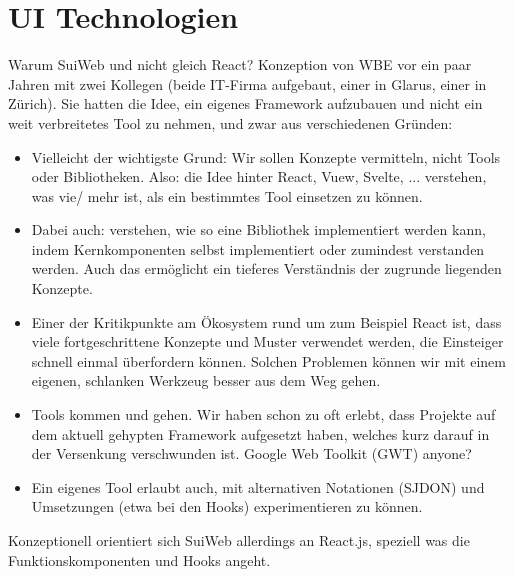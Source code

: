 \section{UI Technologien}

\begin{example2}{Warum SuiWeb und nicht gleich React?}
    Konzeption von WBE vor ein paar Jahren mit zwei Kollegen (beide IT-Firma aufgebaut, einer in Glarus, einer in Zürich). Sie hatten die Idee, ein eigenes Framework aufzubauen und nicht ein weit verbreitetes Tool zu nehmen, und zwar aus verschiedenen Gründen:
    \begin{itemize}
        \item Vielleicht der wichtigste Grund: Wir sollen Konzepte vermitteln, nicht Tools oder Bibliotheken. Also: die Idee hinter React, Vuew, Svelte, ... verstehen, was vie/ mehr ist, als ein bestimmtes Tool einsetzen zu können.
        \item Dabei auch: verstehen, wie so eine Bibliothek implementiert werden kann, indem Kernkomponenten selbst implementiert oder zumindest verstanden werden. Auch das ermöglicht ein tieferes Verständnis der zugrunde liegenden Konzepte.
        \item Einer der Kritikpunkte am Ökosystem rund um zum Beispiel React ist, dass viele fortgeschrittene Konzepte und Muster verwendet werden, die Einsteiger schnell einmal überfordern können. Solchen Problemen können wir mit einem eigenen, schlanken Werkzeug besser aus dem Weg gehen.
        \item Tools kommen und gehen. Wir haben schon zu oft erlebt, dass Projekte auf dem aktuell gehypten Framework aufgesetzt haben, welches kurz darauf in der Versenkung verschwunden ist. Google Web Toolkit (GWT) anyone?
        \item Ein eigenes Tool erlaubt auch, mit alternativen Notationen (SJDON) und Umsetzungen (etwa bei den Hooks) experimentieren zu können.
    \end{itemize}    
    Konzeptionell orientiert sich SuiWeb allerdings an React.js, speziell was die Funktionskomponenten und Hooks angeht.
\end{example2}

